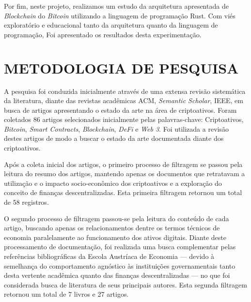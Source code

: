 \documentclass[article,12pt,oneside,a4paper,english,brazil]{unifil}
\begin{document}
\begin{Spacing}{1.5}
Por fim, neste projeto, realizamos um estudo da arquitetura apresentada de \textit{Blockchain} do \textit{Bitcoin} utilizando a linguagem de programação Rust. Com viés exploratório e educacional tanto da arquitetura quanto da linguagem de programação, Foi apresentado os resultados desta experimentação.



% 


\section*{METODOLOGIA DE PESQUISA}
A pesquisa foi conduzida inicialmente através de uma extensa revisão sistemática da literatura, diante das revistas acadêmicas ACM, \textit{Semantic Scholar}, IEEE, em busca de artigos apresentando o estado da arte na área de criptoativos. Foram coletados 86 artigos selecionados inicialmente pelas palavras-chave: Criptoativos, \textit{Bitcoin}, \textit{Smart Contracts}, \textit{Blockchain}, \textit{DeFi} e \textit{Web 3}. Foi utilizada a revisão destes artigos de modo a buscar o estado da arte documentada diante dos criptoativos.

Após a coleta inicial dos artigos, o primeiro processo de filtragem se passou pela leitura do resumo dos artigos, mantendo apenas os documentos que retratavam a utilização e o impacto socio-econômico dos criptoativos e a exploração do conceito de finanças descentralizadas. Esta primeira filtragem retornou um total de 58 registros.

O segundo processo de filtragem passou-se pela leitura do conteúdo de cada artigo, buscando apenas os relacionamentos dentre os termos técnicos de economia paralelamente ao funcionamento dos ativos digitais. Diante deste processamento de documentação, foi realizada uma busca complementar pelas referências bibliográficas da Escola Austríaca de Economia — devido à semelhança do comportamento agnóstico às instituições governamentais tanto desta vertente acadêmica quanto das finanças descentralizadas — no que foi considerada busca de literatura de seus principais autores. Esta segunda filtragem retornou um total de 7 livros e 27 artigos.


\end{Spacing}
\end{document}
